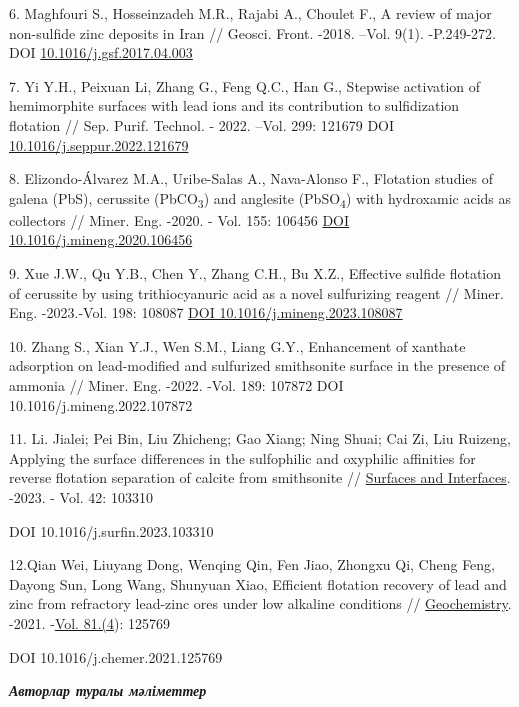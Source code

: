 {6. Maghfouri S., Hosseinzadeh M.R., Rajabi A., Choulet F., A review of
major non-sulfide zinc deposits in Iran // Geosci. Front. -2018. --Vol.
9(1). -P.249-272. DOI
\href{https://doi.org/10.1016/j.gsf.2017.04.003}{10.1016/j.gsf.2017.04.003}

7. Yi Y.H., Peixuan Li, Zhang G., Feng Q.C., Han G., Stepwise activation
of hemimorphite surfaces with lead ions and its contribution to
sulfidization flotation // Sep. Purif. Technol. - 2022. --Vol. 299:
121679 DOI
\href{https://doi.org/10.1016/j.seppur.2022.121679}{10.1016/j.seppur.2022.121679}

8. Elizondo-Álvarez M.A., Uribe-Salas A., Nava-Alonso F., Flotation
studies of galena (PbS), cerussite (PbCO\textsubscript{3}) and anglesite
(PbSO\textsubscript{4}) with hydroxamic acids as collectors // Miner.
Eng. -2020. - Vol. 155: 106456
\href{https://doi.org/10.1016/j.mineng.2020.106456}{DOI
10.1016/j.mineng.2020.106456}

9. Xue J.W., Qu Y.B., Chen Y., Zhang C.H., Bu X.Z., Effective sulfide
flotation of cerussite by using trithiocyanuric acid as a novel
sulfurizing reagent // Miner. Eng. -2023.-Vol. 198: 108087
\href{https://doi.org/10.1016/j.mineng.2023.108087}{DOI
10.1016/j.mineng.2023.108087}

10. Zhang S., Xian Y.J., Wen S.M., Liang G.Y., Enhancement of xanthate
adsorption on lead-modified and sulfurized smithsonite surface in the
presence of ammonia // Miner. Eng. -2022. -Vol. 189: 107872 DOI
10.1016/j.mineng.2022.107872

11. Li. Jialei; Pei Bin, Liu Zhicheng; Gao Xiang; Ning Shuai; Cai Zi,
Liu Ruizeng, Applying the surface differences in the sulfophilic and
oxyphilic affinities for reverse flotation separation of calcite from
smithsonite // \href{javascript:void(0)}{Surfaces and Interfaces}.
-2023. - Vol. 42: 103310

DOI 10.1016/j.surfin.2023.103310

12.Qian Wei, Liuyang Dong, Wenqing Qin, Fen Jiao, Zhongxu Qi, Cheng
Feng, Dayong Sun, Long Wang, Shunyuan Xiao, Efficient flotation recovery
of lead and zinc from refractory lead-zinc ores under low alkaline
conditions //
\href{https://www.sciencedirect.com/journal/geochemistry}{Geochemistry}.
-2021.
-\href{https://www.sciencedirect.com/journal/geochemistry/vol/81/issue/4}{Vol.
81.(4}): 125769

DOI 10.1016/j.chemer.2021.125769

\emph{{\bfseries Авторлар туралы мәліметтер}}

}

